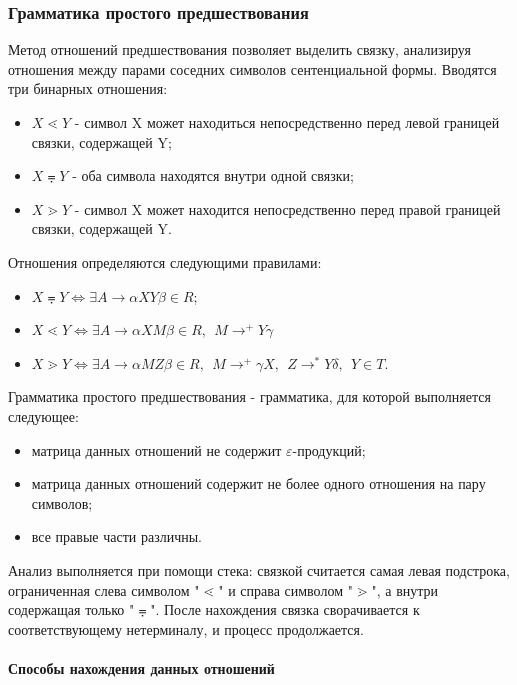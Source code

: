 \documentclass[a4paper,final]{article}
\begin{document}
\subsubsection{Грамматика простого предшествования}
Метод отношений предшествования позволяет выделить связку, анализируя отношения между парами соседних символов сентенциальной формы. Вводятся три бинарных отношения:
\begin{itemize}
    \item $X \lessdot Y$ - символ X может находиться непосредственно перед левой границей связки, содержащей Y;
    \item $X \eqdot Y$ - оба символа находятся внутри одной связки;
    \item $X \gtrdot Y$ - символ X может находится непосредственно перед правой границей связки, содержащей Y.
\end{itemize}

Отношения определяются следующими правилами:
\begin{itemize}
    \item $X \eqdot Y \Longleftrightarrow \exists A \rightarrow \alpha X Y\beta \in R$;
    \item $X \lessdot Y \Longleftrightarrow \exists A \rightarrow \alpha X M \beta \in R, ~~M \rightarrow^+ Y\gamma$
\item $X \gtrdot Y \Longleftrightarrow \exists A \rightarrow \alpha M Z \beta \in R, ~~M \rightarrow^+ \gamma X, ~~Z\rightarrow^* Y\delta, ~~ Y \in T$.
\end{itemize}

Грамматика простого предшествования - грамматика, для которой выполняется следующее:
\begin{itemize}
    \item матрица данных отношений не содержит $\varepsilon$-продукций;
    \item матрица данных отношений содержит не более одного отношения на пару символов;
    \item все правые части различны.
\end{itemize}

Анализ выполняется при помощи стека: связкой считается самая левая подстрока, ограниченная слева символом "$\lessdot$" и справа символом "$\gtrdot$", а внутри содержащая только "$\eqdot$". После нахождения связка сворачивается к соответствующему нетерминалу, и процесс продолжается.

\paragraph{Способы нахождения данных отношений}\mbox{}
\end{document}
